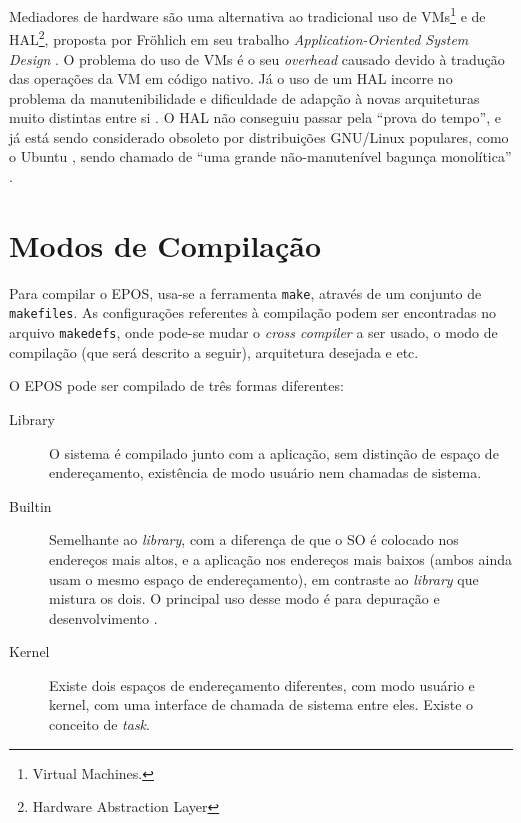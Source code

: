 Mediadores de hardware são uma alternativa ao tradicional uso de VMs\footnote{Virtual Machines.} e de HAL\footnote{Hardware Abstraction Layer}, proposta por Fröhlich em seu trabalho \emph{Application-Oriented System Design} \cite{guto_thesis}. O problema do uso de VMs é o seu \emph{overhead} causado devido à tradução das operações da VM em código nativo. Já o uso de um HAL incorre no problema da manutenibilidade e dificuldade de adapção à novas arquiteturas muito distintas entre si \cite{hw_mediators}. O HAL não conseguiu passar pela ``prova do tempo'', e já está sendo considerado obsoleto por distribuições GNU/Linux populares, como o 
Ubuntu \cite{linux_magazine}, sendo chamado de ``uma grande não-manutenível bagunça monolítica'' \cite{halsectomy}.





\section{Modos de Compilação}

Para compilar o EPOS, usa-se a ferramenta \verb+make+, através de um conjunto de \verb+makefiles+. As configurações referentes à compilação podem ser encontradas no arquivo \verb+makedefs+, onde pode-se mudar o \emph{cross compiler} a ser usado, o modo de compilação (que será descrito a seguir), arquitetura desejada e etc.


O EPOS pode ser compilado de três formas diferentes:

\begin{description}
\item[Library] O sistema é compilado junto com a aplicação, sem distinção de espaço de endereçamento, existência de modo usuário nem chamadas de sistema.
\item[Builtin] Semelhante ao \emph{library}, com a diferença de que o SO é colocado nos endereços mais altos, e a aplicação nos endereços mais baixos (ambos ainda usam o mesmo espaço de endereçamento), em contraste ao \emph{library} que mistura os dois. O principal uso desse modo é para depuração e desenvolvimento \cite{EPOS}.
\item[Kernel] Existe dois espaços de endereçamento diferentes, com modo usuário e kernel, com uma interface de chamada de sistema entre eles. Existe o conceito de \emph{task}.

\end{description}

